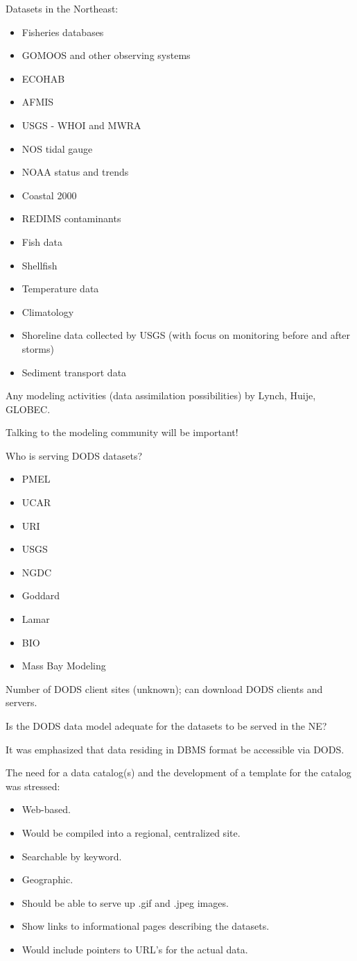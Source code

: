 Datasets in the Northeast:
\begin{itemize}
\item Fisheries databases
\item GOMOOS and other observing systems
\item ECOHAB
\item AFMIS
\item USGS - WHOI and MWRA
\item NOS tidal gauge
\item NOAA status and trends
\item Coastal 2000
\item REDIMS contaminants
\item Fish data
\item Shellfish
\item Temperature data
\item Climatology
\item Shoreline data collected by USGS (with focus on monitoring
  before and after storms)
\item Sediment transport data
\end{itemize}

Any modeling activities (data assimilation possibilities) by Lynch, Huije, GLOBEC.

Talking to the modeling community will be important!

Who is serving DODS datasets?  

\begin{itemize}
\item PMEL
\item UCAR
\item URI
\item USGS
\item NGDC
\item Goddard
\item Lamar
\item BIO
\item Mass Bay Modeling
\end{itemize}

Number of DODS client sites (unknown); can download DODS clients and servers.

Is the DODS data model adequate for the datasets to be served in the NE?

It was emphasized that data residing in DBMS format be accessible via DODS.

The need for a data catalog(s) and the development of a template for
the catalog was stressed:
\begin{itemize}
\item    Web-based.
\item Would be compiled into a regional, centralized site.
\item Searchable by keyword.
\item Geographic.
\item Should be able to serve up .gif and .jpeg images.
\item Show links to informational pages describing the datasets.
\item Would include pointers to URL's for the actual data.
\end{itemize}

